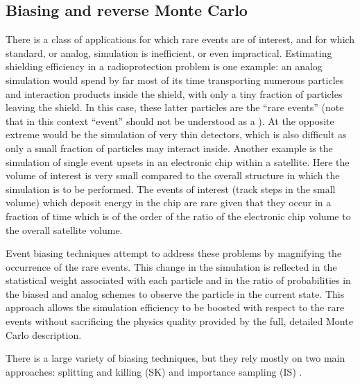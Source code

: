 \label{sec:biasreverse}

\subsection{\textbf{Biasing and reverse Monte Carlo}}\label{sec:biasrev}
There is a class of applications for which rare events are of interest, and for
which standard, or analog, simulation is inefficient, or even impractical.
Estimating shielding efficiency in a radioprotection problem is one example: an
analog simulation would spend by far most of its time transporting numerous 
particles and interaction products inside the shield, with only a tiny fraction
of particles leaving the shield.  In this case, these latter particles are the 
``rare events'' (note that in this context ``event'' should not be understood 
as a ).  At the opposite extreme would be the simulation of very
thin detectors, which is also difficult as only a small fraction of particles 
may interact inside.  Another example is the simulation of single event upsets 
in an electronic chip within a satellite.  Here the volume of interest is very 
small compared to the overall structure in which the simulation is to be 
performed.  The events of interest (track steps in the small volume) which 
deposit energy in the chip are rare given that they occur in a fraction of time
which is of the order of the ratio of the electronic chip volume to the overall 
satellite volume.

Event biasing techniques attempt to address these problems by magnifying the 
occurrence of the rare events.  This change in the simulation is reflected in
the statistical weight associated with each particle and in the ratio of 
probabilities in the biased and analog schemes to observe the particle in the
current state.  This approach allows the simulation efficiency to be boosted 
with respect to the rare events without sacrificing the physics quality 
provided by the full, detailed Monte Carlo description.

There is a large variety of biasing techniques, but they rely mostly on two main
approaches: splitting and killing (SK) \cite{bib:SK}\cite{bib:biasGeneral} and 
importance sampling (IS) \cite{bib:ImpS}\cite{bib:biasGeneral}.

